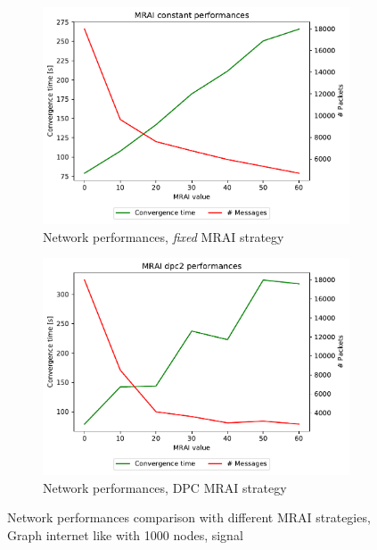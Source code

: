\begin{figure}[h]
     \centering
     \begin{subfigure}[b]{0.45\textwidth}
         \centering
         \includegraphics[width=\textwidth]{images/internet_like/1000/signals/AWA/constant/internet_like-constant_AWA_mrai_evolution.pdf}
		 \caption{Network performances, \textit{fixed} \ac{MRAI} strategy}
         \label{fig:internet_like_1000_fixed_AWA}
     \end{subfigure}
     \hfill
     \begin{subfigure}[b]{0.45\textwidth}
         \centering
         \includegraphics[width=\textwidth]{images/internet_like/1000/signals/AWA/dpc/internet_like-DPC_AWA_mrai_evolution.pdf}
		 \caption{Network performances, \ac{DPC} \ac{MRAI} strategy}
         \label{fig:internet_like_1000_dpc_AWA}
     \end{subfigure}
	 \caption{Network performances comparison with different \ac{MRAI} strategies,
		Graph internet like with \num{1000} nodes, signal }
        \label{fig:internt_like_1000_evolution_AWA}
\end{figure}

